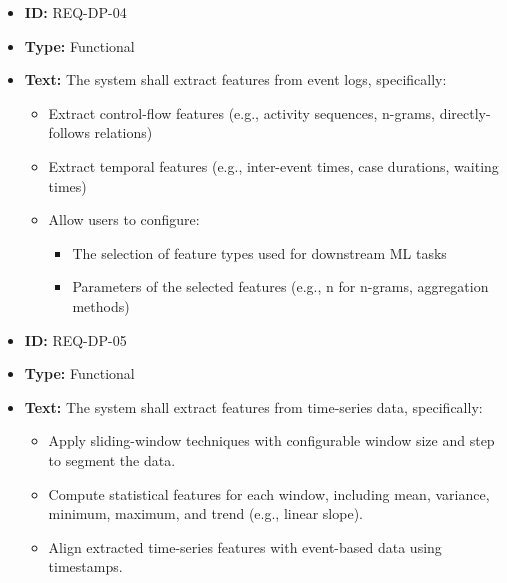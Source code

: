\documentclass[runningheads]{llncs}
\begin{document}
\begin{itemize}
          \vspace{1em}
    \item \textbf{ID:} REQ-DP-04
    \item \textbf{Type:} Functional
    \item \textbf{Text:} The system shall extract features from event logs, specifically:
          \begin{itemize}
              \item Extract control-flow features (e.g., activity sequences, n-grams, directly-follows relations)
              \item Extract temporal features (e.g., inter-event times, case durations, waiting times)
              \item Allow users to configure:
                    \begin{itemize}
                        \item The selection of feature types used for downstream ML tasks
                        \item Parameters of the selected features (e.g., n for n-grams, aggregation methods)
                    \end{itemize}
          \end{itemize}

          \vspace{1em}
    \item \textbf{ID:} REQ-DP-05
    \item \textbf{Type:} Functional
    \item \textbf{Text:} The system shall extract features from time-series data, specifically:
          \begin{itemize}
              \item Apply sliding-window techniques with configurable window size and step to segment the data.
              \item Compute statistical features for each window, including mean, variance, minimum, maximum, and trend (e.g., linear slope).
              \item Align extracted time-series features with event-based data using timestamps.
          \end{itemize}


\end{itemize}
\end{document}
